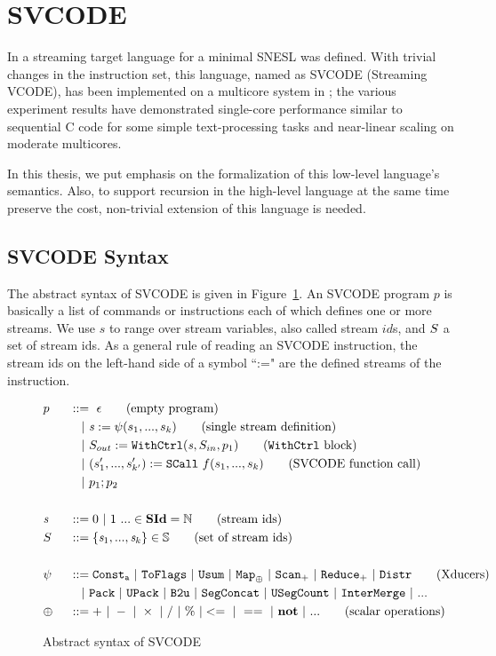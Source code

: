 \section{SVCODE}
In \cite{Fmaster} a streaming target language for a minimal SNESL was defined.
With trivial changes in the instruction set, this language, named as SVCODE (Streaming VCODE), has been implemented on a multicore system in \cite{MF16}; the various experiment results
have demonstrated single-core performance similar to sequential C code for some simple 
text-processing tasks and near-linear scaling on moderate multicores.

In this thesis, we put emphasis on the formalization of this low-level language's semantics.
Also, to support recursion in the high-level language at the same time preserve the cost, non-trivial extension of this language is needed. 

\subsection{SVCODE Syntax}

The abstract syntax of SVCODE is given in Figure~\ref{fig-svcode1-gram}.
An SVCODE program $p$ is basically a list of commands or instructions each of which defines one or more streams. 
We use $s$ to range over stream variables, also called stream $id$s, and $\S$ a set of stream ids.
As a general rule of reading an SVCODE instruction, the stream ids on the left-hand side of a symbol ``:=" are the defined streams of the instruction.


\begin{figure}[H] \large
	\begin{alignat*}{2}
	&p  && :: = \ \epsilon \tag{empty program}\\ 
	&   && \quad | \ \sdef{\s}{\psi(s_1,...,s_k)}  \tag{single stream definition}\\
	&   && \quad | \ \withctrl{\s}{p_1}{\Sin}{\Sout}  \tag{\wc block}\\
	&   && \quad | \ \scall{f}{s_1,...,s_k}{(s_1',...,s_{k'}')} \tag{SVCODE function call}\\
	&   && \quad | \ p_1;p_2  \\
	\\
	&\s && ::= 0 \ | \ 1 \ ... \in \SId  = \mathbb{N}   \tag{stream ids}\\
	&  \S && ::= \{\s_1,..., \s_k\} \in \sset  \tag{set of stream ids}\\
	\\
	& \psi \ && ::= \consta{a} \ | \ \toflag  
	\ | \ \usum \ | \ \map{\oplus} \ | \ \genscan_{+} \ | \ \genreduce_{+} \ | \ \distr  \tag{Xducers}  \\
    &   && \quad | \ \pack \ | \ \upack \ | \ \bu \ | \ \segconcat \ | \ \usegcount \ | \ \intermerge \ | \ ...  \\
    & \oplus  \ && :: = + \ | \ - \ | \ \times \ |  \  / \ | \ \% \ | <= \ | \ == \ | \  \*{not} \ | \ ... \tag{scalar operations}
	\end{alignat*}
	\caption{Abstract syntax of SVCODE \label{fig-svcode1-gram}}
\end{figure}


